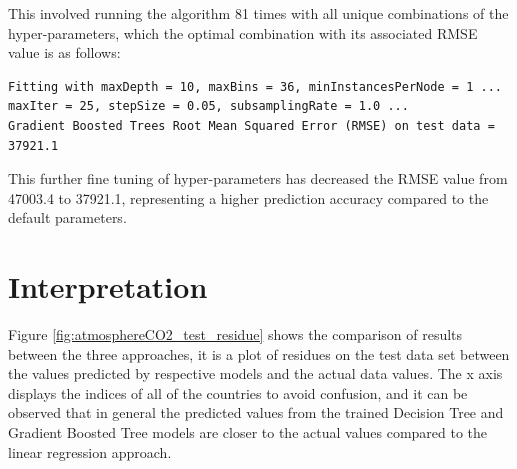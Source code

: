 \documentclass[11pt,a4paper,titlepage]{article}
\begin{document}
This involved running the algorithm 81 times with all unique combinations of the hyper-parameters, which the optimal combination with its associated RMSE value is as follows:

\begin{verbatim}
Fitting with maxDepth = 10, maxBins = 36, minInstancesPerNode = 1 ...
maxIter = 25, stepSize = 0.05, subsamplingRate = 1.0 ...
Gradient Boosted Trees Root Mean Squared Error (RMSE) on test data = 37921.1
\end{verbatim}

This further fine tuning of hyper-parameters has decreased the RMSE value from 47003.4 to 37921.1, representing a higher prediction accuracy compared to the default parameters.

\section{Interpretation}




Figure \ref{fig:atmosphereCO2_test_residue} shows the comparison of results between the three approaches, it is a plot of residues on the test data set between the values predicted by respective models and the actual data values. The x axis displays the indices of all of the countries to avoid confusion, and it can be observed that in general the predicted values from the trained Decision Tree and Gradient Boosted Tree models are closer to the actual values compared to the linear regression approach.
\end{document}
